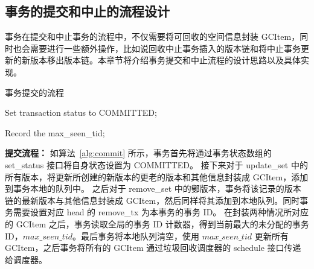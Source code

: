 \subsection{事务的提交和中止的流程设计}
\label{ssec:commit-abort}

事务在提交和中止事务的流程中，不仅需要将可回收的空间信息封装 GCItem，同时也会需要进行一些额外操作，比如说回收中止事务插入的版本链和将中止事务更新的新版本移出版本链。本章节将介绍事务提交和中止流程的设计思路以及具体实现。

\begin{algorithm}[h]
    \caption{事务提交的流程}
    \label{alg:commit}
    \BlankLine
    Set transaction status to COMMITTED;



    Record the max\_seen\_tid;



\end{algorithm}

\textbf{提交流程：} 如算法~\ref{alg:commit} 所示，事务首先将通过事务状态数组的 set\_status 接口将自身状态设置为 COMMITTED。
接下来对于 update\_set 中的所有版本，将更新所创建的新版本的更老的版本和其他信息封装成 GCItem，添加到事务本地的队列中。
之后对于 remove\_set 中的鄋版本，事务将该记录的版本链的最新版本与其他信息封装成 GCItem，然后同样将其添加到本地队列。同时事务需要设置对应 head 的 remove\_tx 为本事务的事务 ID。
在封装两种情况所对应的 GCItem 之后，事务读取全局的事务 ID 计数器，得到当前最大的未分配的事务 ID，$max\_seen\_tid$。最后事务将本地队列清空，使用 $max\_seen\_tid$ 更新所有 GCItem，之后事务将所有的 GCItem 通过垃圾回收调度器的 schedule 接口传递给调度器。



